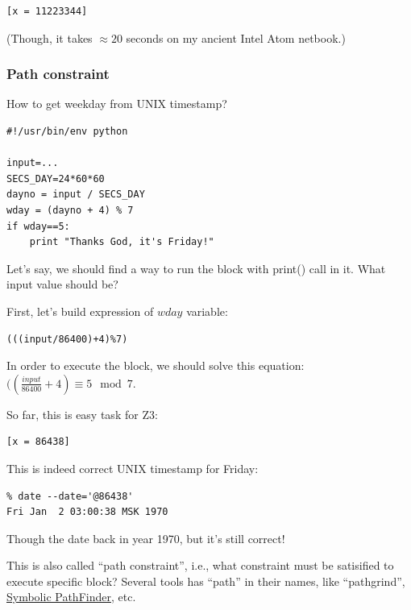 

\begin{lstlisting}
[x = 11223344]
\end{lstlisting}

(Though, it takes $\approx 20$ seconds on my ancient Intel Atom netbook.)

\subsubsection{Path constraint}

How to get weekday from UNIX timestamp?

\begin{lstlisting}
#!/usr/bin/env python

input=...
SECS_DAY=24*60*60
dayno = input / SECS_DAY
wday = (dayno + 4) % 7
if wday==5:
    print "Thanks God, it's Friday!"
\end{lstlisting}

Let's say, we should find a way to run the block with print() call in it.
What input value should be?

First, let's build expression of $wday$ variable:



\begin{lstlisting}
(((input/86400)+4)%7)
\end{lstlisting}

In order to execute the block, we should solve this equation: $((\frac{input}{86400}+4) \equiv 5 \mod 7$.

So far, this is easy task for Z3:



\begin{lstlisting}
[x = 86438]
\end{lstlisting}

This is indeed correct UNIX timestamp for Friday:

\begin{lstlisting}
% date --date='@86438'
Fri Jan  2 03:00:38 MSK 1970
\end{lstlisting}

Though the date back in year 1970, but it's still correct!

This is also called ``path constraint'', i.e., what constraint must be satisified to execute specific block?
Several tools has ``path'' in their names, like
``pathgrind'', 
\href{http://babelfish.arc.nasa.gov/trac/jpf/wiki/projects/jpf-symbc}{Symbolic PathFinder}, etc.

